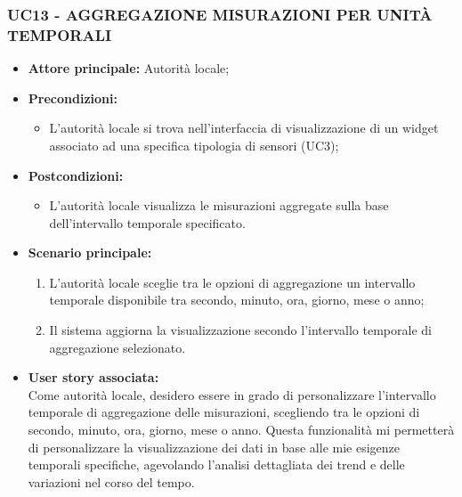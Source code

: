 \subsubsection{UC13 - AGGREGAZIONE MISURAZIONI PER UNITÀ TEMPORALI}
\begin{itemize}
    \item \textbf{Attore principale:} Autorità locale;
    \item \textbf{Precondizioni:}
            \begin{itemize}
                \item L'autorità locale si trova nell'interfaccia di visualizzazione di un widget associato ad una specifica tipologia di sensori (UC3); 
            \end{itemize}
    \item \textbf{Postcondizioni:}
          \begin{itemize}
              \item L'autorità locale visualizza le misurazioni aggregate sulla base dell'intervallo temporale specificato.
          \end{itemize}
    \item \textbf{Scenario principale:}
          \begin{enumerate}
             \item L'autorità locale sceglie tra le opzioni di aggregazione un intervallo temporale disponibile tra secondo, minuto, ora, giorno, mese o anno;
             \item Il sistema aggiorna la visualizzazione secondo l'intervallo temporale di aggregazione selezionato.
          \end{enumerate}
    \item \textbf{User story associata:} \\
        Come autorità locale, desidero essere in grado di personalizzare l'intervallo temporale di aggregazione delle misurazioni, scegliendo tra le opzioni di secondo, minuto, ora, giorno, mese o anno. Questa funzionalità mi permetterà di personalizzare la visualizzazione dei dati in base alle mie esigenze temporali specifiche, agevolando l'analisi dettagliata dei trend e delle variazioni nel corso del tempo.
\end{itemize}